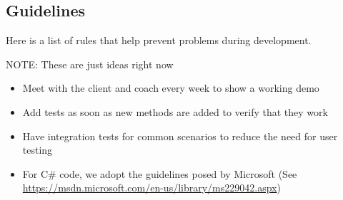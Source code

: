 \subsection{Guidelines}

Here is a list of rules that help prevent problems during development.

{\color{red} NOTE: These are just ideas right now}

\begin{itemize}
	\item Meet with the client and coach every week to show a working demo
	\item Add tests as soon as new methods are added to verify that they work
	\item Have integration tests for common scenarios to reduce the need for user testing
	\item For C\# code, we adopt the guidelines posed by Microsoft
		  (See \url{https://msdn.microsoft.com/en-us/library/ms229042.aspx})
\end{itemize}